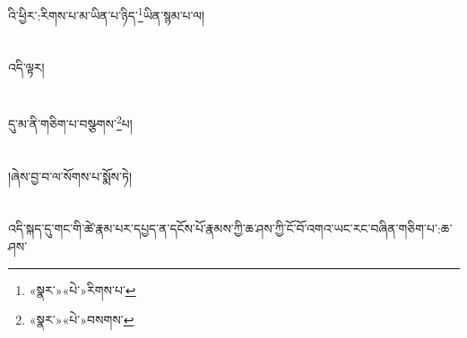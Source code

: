 འི་ཕྱིར་:རིགས་པ་མ་ཡིན་པ་ཉིད་\footnote{«སྣར་»«པེ་»རིགས་པ་}ཡིན་སྙམ་པ་ལ།\chapter{ }འདི་ལྟར།\chapter{ }དུ་མ་ནི་གཅིག་པ་བསྩགས་\footnote{«སྣར་»«པེ་»བསགས་}པ།\chapter{ }།ཞེས་བྱ་བ་ལ་སོགས་པ་སྨོས་ཏེ།\chapter{ }འདི་སྐད་དུ་གང་གི་ཚེ་རྣམ་པར་དཔྱད་ན་དངོས་པོ་རྣམས་ཀྱི་ཆ་ཤས་ཀྱི་ངོ་བོ་འགའ་ཡང་རང་བཞིན་གཅིག་པ་:ཆ་ཤས་\foo